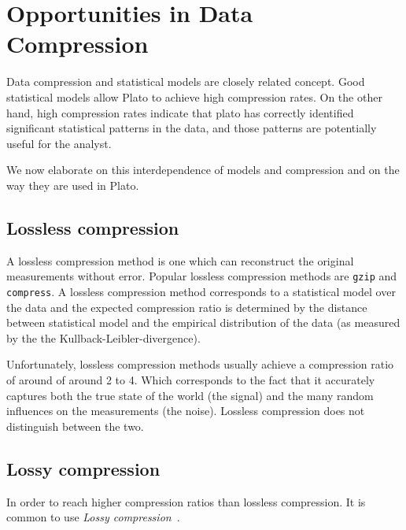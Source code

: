 
\section{Opportunities in Data Compression}
\label{sec:compression}

Data compression and statistical models are closely related
concept. Good statistical models allow Plato to achieve high
compression rates. On the other hand, high compression rates indicate
that plato has correctly identified significant statistical patterns
in the data, and those patterns are potentially useful for the
analyst.

We now elaborate on this interdependence of models and compression and
on the way they are used in Plato.

\subsection{Lossless compression}
A lossless compression method is one which can reconstruct the
original measurements without error. Popular lossless compression
methods are {\tt gzip} and {\tt compress}. A lossless compression
method corresponds to a statistical model over the data and the
expected compression ratio is determined by the distance between
statistical model and the empirical distribution of the data (as
measured by the the Kullback-Leibler-divergence). 

Unfortunately, lossless compression methods usually achieve a
compression ratio of around of around 2 to 4. Which corresponds to the
fact that it accurately captures both the true state of the world (the signal)
and the many random influences on the measurements (the noise). 
Lossless compression does not distinguish between the two.

\newcommand{\vx}{\mathbf{x}}
\newcommand{\hx}{\hat{x}}
\newcommand{\vhx}{\hat{\mathbf{x}}}
\newcommand{\vc}{\mathbf{c}}

\subsection{Lossy compression}
In order to reach higher compression ratios than lossless
compression. It is common to use {\em Lossy compression}~\cite{CompressionBook}.

